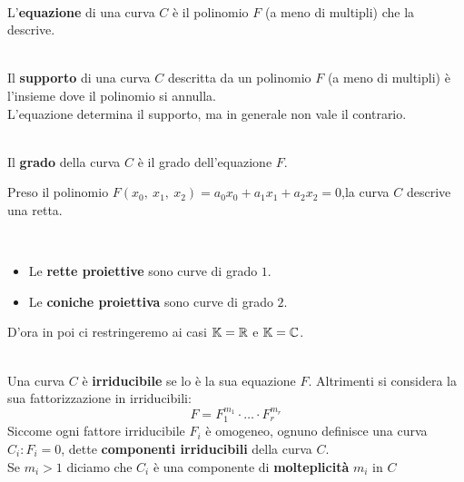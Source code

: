 \begin{define}~{}\\
	L'\textbf{equazione} di una curva $C$ è il polinomio $F$ (a meno di multipli) che la descrive.
\end{define}
\begin{define}~{}\\
	Il \textbf{supporto} di una curva $C$ descritta da un polinomio $F$ (a meno di multipli) è l'insieme dove il polinomio si annulla.\\
	L'equazione determina il supporto, ma in generale non vale il contrario.
\end{define}
\begin{define}~{}\\
	Il \textbf{grado} della curva $C$ è il grado dell'equazione $F$.
\end{define}
\begin{example}
	Preso il polinomio $F(x_0,\ x_1,\ x_2)=a_0x_0+a_1x_1+a_2x_2=0$,la curva $C$ descrive una retta.
\end{example}
\begin{define}~{}
	\begin{itemize}
		\item Le \textbf{rette proiettive} sono curve di grado $1$.
		\item Le \textbf{coniche proiettiva} sono curve di grado $2$.
	\end{itemize}
\vspace{-3mm}
\end{define}
D'ora in poi ci restringeremo ai casi $\mathbb{K}=\mathbb{R}$ e $\mathbb{K}=\mathbb{C}$.
\begin{define}~{}\\
Una curva $C$ è \textbf{irriducibile} se lo è la sua equazione $F$. Altrimenti si considera la sua fattorizzazione in irriducibili:
\begin{equation}
	F=F_1^{m_1}\cdot \ldots \cdot F_r^{m_r}
\end{equation}
Siccome ogni fattore irriducibile $F_i$ è omogeneo, ognuno definisce una curva $C_i\colon F_i=0$, dette \textbf{componenti irriducibili} della curva $C$.\\
Se $m_i>1$ diciamo che $C_i$ è una componente di \textbf{molteplicità} $m_i$ in $C$
\end{define}

